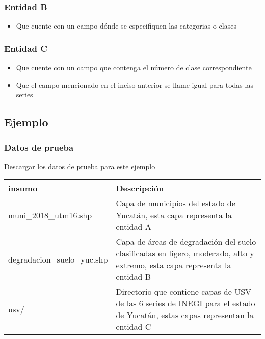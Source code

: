 \documentclass[letterpaper,10pt,spanish]{sphinxmanual}
\begin{document}
\subsubsection{Entidad B}
\label{\detokenize{tabulacion_3geo:entidad-b}}\begin{itemize}
\item {} 
Que cuente con un campo dónde se especifiquen las categorias o clases

\end{itemize}


\subsubsection{Entidad C}
\label{\detokenize{tabulacion_3geo:entidad-c}}\begin{itemize}
\item {} 
Que cuente con un campo que contenga el número de clase correspondiente

\item {} 
Que el campo mencionado en el inciso anterior se llame igual para todas las series

\end{itemize}


\subsection{Ejemplo}
\label{\detokenize{tabulacion_3geo:ejemplo}}

\subsubsection{Datos de prueba}
\label{\detokenize{tabulacion_3geo:datos-de-prueba}}
Descargar los datos de prueba para este ejemplo 


\begin{savenotes}\sphinxattablestart
\centering
\begin{tabulary}{\linewidth}[t]{|T|T|}
\hline
\sphinxstyletheadfamily 
insumo
&\sphinxstyletheadfamily 
Descripción
\\
\hline
muni\_2018\_utm16.shp
&
Capa de municipios del estado de Yucatán, esta capa representa la entidad A
\\
\hline
degradacion\_suelo\_yuc.shp
&
Capa de áreas de degradación del suelo clasificadas en ligero, moderado, alto y extremo, esta capa representa la entidad B
\\
\hline
usv/
&
Directorio que contiene capas de USV de las 6 series de INEGI para el estado de Yucatán, estas capas representan la entidad C
\\
\hline
\end{tabulary}
\par
\sphinxattableend\end{savenotes}
\end{document}
